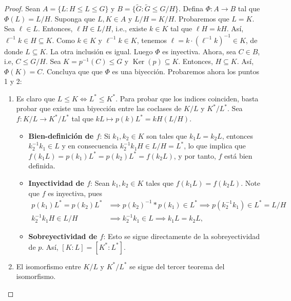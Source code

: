 \documentclass[11pt,twoside]{article}
\DeclareMathOperator{\Ker}{Ker}
\begin{document}
\begin{proof}
Sean $A = \{ L: H\leq L \leq G \}$ y $B = \{ \tilde{G}: \tilde{G} \leq G / H \}$. Defina $\Phi:A \to B$ tal que $\Phi(L) = L / H$. Suponga que $L,K \in A$ y $L / H = K /H$. Probaremos que $L = K$. Sea $\ell \in L$. Entonces, $\ell H \in L / H$, i.e., existe $k \in K$ tal que $\ell H = k H$. Así, $\ell ^{-1} k \in H \subseteq K$. Como $k \in K$ y $\ell^{-1}k \in K$, tenemos $\ell = k \cdot (\ell^{-1}k)^{-1} \in K$, de donde $L \subseteq K$. La otra inclusión es igual. Luego $\Phi$ es inyectiva. Ahora, sea $C \in B$,  i.e, $C \leq G / H$. Sea $K = p ^{-1}(C) \leq G$ y $\Ker(p) \subseteq K$. Entonces, $H \subseteq K$. Así, $\Phi(K)=C$. Concluya que que $\Phi$ es una biyección. Probaremos ahora los puntos 1 y 2:
\begin{enumerate}[label=(\arabic*)]
\item Es claro que $L \leq K \iff L ^\ast \leq K^{\ast}$. Para probar que los indices coinciden, basta probar que existe una biyección entre las coclases de $K/L$ y $K^\ast/L^{\ast}$. Sea $f:K/L \to K^{\ast}/L^{\ast}$ tal que $kL \mapsto p(k)L^{\ast} = kH (L / H)$.
\begin{itemize}
\item \textbf{Bien-definición de $f$}: Si $k_{1}, k_{2} \in K$ son tales que $k_{1}L = k_{2}L$, entonces $k_{2}^{-1} k_{1} \in L$ y en consecuencia $k_{2}^{-1} k_{1} H \in L/H = L^{\ast}$, lo que implica que $f(k_{1}L) = p(k_{1}) L^\ast = p(k_{2}) L^{\ast} = f(k_{2}L)$, y por tanto, $f$ está bien definida.
\item \textbf{Inyectividad de $f$}: Sean $k_{1}, k_{2} \in K$ tales que $f(k_{1}L) = f(k_{2}L)$. Note que $f$ es inyectiva, pues
\[
\begin{aligned}
p(k_{1})L^{\ast} = p(k_{2}) L^{\ast} &\implies p(k_{2})^{-1} \ast p(k_{1}) \in L^{\ast} \implies p(k_{2}^{-1} k_{1}) \in L^\ast = L/H \\
k_{2}^{-1} k_{1} H \in L / H &\implies k_{2}^{-1} k_{1} \in L \implies k_{1}L = k_{2}L,
\end{aligned}
\]
\item \textbf{Sobreyectividad de $f$}: Esto se sigue directamente de la sobreyectividad de $p$.
Así, $[K:L] = [K^{\ast}:L^{\ast}]$.
\end{itemize}
\item El isomorfismo entre $K/L$ y $K^{\ast}/L^{\ast}$ se sigue del tercer teorema del isomorfismo.
\end{enumerate}
\end{proof}
\end{document}
